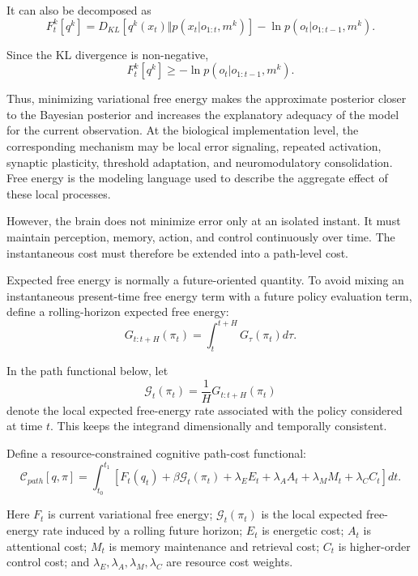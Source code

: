 \documentclass[11pt, a4paper]{article}
\begin{document}
It can also be decomposed as
\begin{equation}
F_t^k[q^k]
=
D_{KL}
\left[
q^k(x_t)
\Vert
p(x_t|o_{1:t},m^k)
\right]
-
\ln p(o_t|o_{1:t-1},m^k).
\end{equation}

Since the KL divergence is non-negative,
\begin{equation}
F_t^k[q^k]
\ge
-\ln p(o_t|o_{1:t-1},m^k).
\end{equation}

Thus, minimizing variational free energy makes the approximate posterior closer to the Bayesian posterior and increases the explanatory adequacy of the model for the current observation. At the biological implementation level, the corresponding mechanism may be local error signaling, repeated activation, synaptic plasticity, threshold adaptation, and neuromodulatory consolidation. Free energy is the modeling language used to describe the aggregate effect of these local processes.

However, the brain does not minimize error only at an isolated instant. It must maintain perception, memory, action, and control continuously over time. The instantaneous cost must therefore be extended into a path-level cost.

Expected free energy is normally a future-oriented quantity. To avoid mixing an instantaneous present-time free energy term with a future policy evaluation term, define a rolling-horizon expected free energy:
\begin{equation}
G_{t:t+H}(\pi_t)
=
\int_t^{t+H}G_\tau(\pi_t)d\tau.
\end{equation}

In the path functional below, let
\begin{equation}
\mathcal{G}_t(\pi_t)
=
\frac{1}{H}G_{t:t+H}(\pi_t)
\end{equation}
denote the local expected free-energy rate associated with the policy considered at time $t$. This keeps the integrand dimensionally and temporally consistent.

Define a resource-constrained cognitive path-cost functional:
\begin{equation}
\mathcal{C}_{path}[q,\pi]
=
\int_{t_0}^{t_1}
\left[
F_t(q_t)
+
\beta \mathcal{G}_t(\pi_t)
+
\lambda_E E_t
+
\lambda_A A_t
+
\lambda_M M_t
+
\lambda_C C_t
\right]dt.
\end{equation}

Here $F_t$ is current variational free energy; $\mathcal{G}_t(\pi_t)$ is the local expected free-energy rate induced by a rolling future horizon; $E_t$ is energetic cost; $A_t$ is attentional cost; $M_t$ is memory maintenance and retrieval cost; $C_t$ is higher-order control cost; and $\lambda_E,\lambda_A,\lambda_M,\lambda_C$ are resource cost weights.
\end{document}
